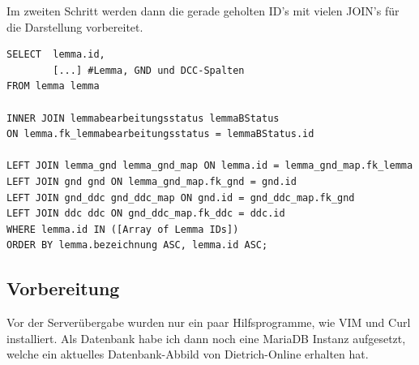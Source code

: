 Im zweiten Schritt werden dann die gerade geholten ID’s mit vielen JOIN’s für die Darstellung vorbereitet.

\lstset{language=SQL}
\begin{lstlisting}[frame=single] 
SELECT  lemma.id,                        
        [...] #Lemma, GND und DCC-Spalten        
FROM lemma lemma
      
INNER JOIN lemmabearbeitungsstatus lemmaBStatus
ON lemma.fk_lemmabearbeitungsstatus = lemmaBStatus.id

LEFT JOIN lemma_gnd lemma_gnd_map ON lemma.id = lemma_gnd_map.fk_lemma
LEFT JOIN gnd gnd ON lemma_gnd_map.fk_gnd = gnd.id
LEFT JOIN gnd_ddc gnd_ddc_map ON gnd.id = gnd_ddc_map.fk_gnd
LEFT JOIN ddc ddc ON gnd_ddc_map.fk_ddc = ddc.id
WHERE lemma.id IN ([Array of Lemma IDs])
ORDER BY lemma.bezeichnung ASC, lemma.id ASC;

\end{lstlisting}

\subsection{Vorbereitung}

Vor der Serverübergabe wurden nur ein paar Hilfsprogramme, wie VIM und Curl installiert. Als Datenbank habe ich dann noch eine MariaDB Instanz aufgesetzt, welche ein aktuelles Datenbank-Abbild von Dietrich-Online erhalten hat.